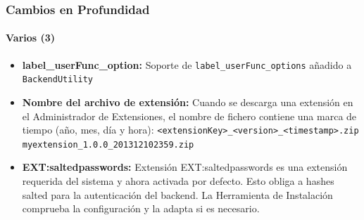 \begin{frame}[fragile]
	\frametitle{Cambios en Profundidad}
	\framesubtitle{Varios (3)}

	\begin{itemize}

		\item \textbf{label\_userFunc\_option:}\newline
			\small
				Soporte de \texttt{label\_userFunc\_options} añadido a \texttt{BackendUtility}
			\normalsize

		\item \textbf{Nombre del archivo de extensión:}\newline
			\small
				Cuando se descarga una extensión en el Administrador de Extensiones, el nombre de fichero  contiene una marca de tiempo (año, mes, día y hora):\newline
				\texttt{<extensionKey>\_<version>\_<timestamp>.zip}\newline
				\texttt{myextension\_1.0.0\_201312102359.zip}
			\normalsize

		\item \textbf{EXT:saltedpasswords:}\newline
			\small
				Extensión EXT:saltedpasswords es una extensión requerida del sistema y ahora activada por defecto.
				Esto obliga a hashes salted para la autenticación del backend. La Herramienta de Instalación comprueba la configuración y la adapta si es necesario.
			\normalsize

	\end{itemize}

\end{frame}


